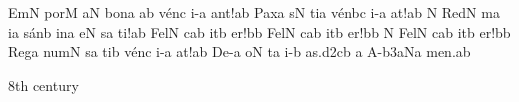 \initiumgregorianum
{}%
\sgn {}Em\punctum N\egn
\sgn por\punctum M\egn
\sgn {}a{}\punctum N\egn
\spatium
\sgn b{o}n\punctum a\egn
\sgn {}a{}\punctum b\egn
\spatium
\sgn v{\'e}n\punctum c\egn
\sgn {}i-\punctum a\egn
\sgn {}a{nt!}\punctum a\augmentum b\egn
\spatium
\divisiofinalis
\spatium
\sgn Pax\chorus\punctum a\egn
\spatium
{}s\punctum N\egn
\sgn ti{}\punctum a\egn
\spatium
\sgn v{\'e}n\pes bc\egn
\sgn {}i-\punctum a\egn
\sgn {}a{t!}\punctum a\augmentum b\egn
\spatium
\divisiofinalis
\spatium
\custos N
\lineaproxima
\sgn Red\cantores\punctum N\egn
{}m\punctum a\egn
{}i{}\punctum a\egn
\spatium
\sgn s{\'a}n\punctum b\egn
{}in\punctum a\egn
\sgn {}e{}\punctum N\egn
\spatium
{}s\punctum a\egn
\sgn ti!\punctum a\augmentum b\egn
\spatium
\divisiofinalis
\spatium
\sgn Fel\punctum N\egn
\sgn {}{\'\i}c\pes ab\egn
\sgn {}it\punctum b\egn
\sgn {}e{r!}\punctum b\augmentum b\egn
\spatium
\divisiofinalis
\spatium
\sgn Fel\chorus\punctum N\egn
\sgn {}{\'\i}c\pes ab\egn
\sgn {}it\punctum b\egn
\sgn {}e{r!}\punctum b\augmentum b\egn
\spatium
\divisiofinalis
\spatium
\custos N
\lineaproxima
\sgn Fel\omnes\punctum N\egn
\sgn {}{\'\i}c\pes ab\egn
\sgn {}it\punctum b\egn
\sgn {}e{r!}\punctum b\augmentum b\egn
\spatium
\divisiofinalis
\spatium
\sgn Reg\punctum a\egn
\sgn num\punctum N\egn
\spatium
{}s\punctum a\egn
\sgn ti{}\punctum b\egn
\spatium
\sgn v{\'e}n\punctum c\egn
\sgn {}i-\punctum a\egn
\sgn {}a{t!}\punctum a\augmentum b\egn
\spatium
\divisiominor
\spatium
\sgn D{e}-\punctum a\egn
\sgn {}o{}\punctum N\egn
\spatium
{}t\punctum a\egn
\sgn {}i-\punctum b\egn
\sgn {}a{s.}\episem d2\clivis cb\egn
\spatium
\divisiominima
\spatium
\custos a
\lineaproxima
\sgn {}A-\episem b3\porrectus aNa\egn
\sgn me{n.}\punctum a\augmentum b\egn
\spatium
\Finisgregoriana






\bigskip

\source 8th century

